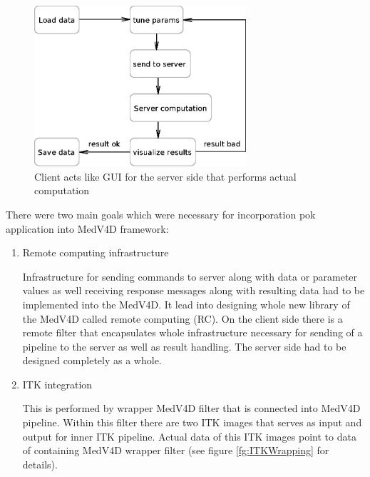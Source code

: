 \begin{figure}
    \centering
    \includegraphics[width=0.7\textwidth]{data/computationProcess}
    \caption[LevelSetClient application computation process]{Client acts like GUI for the server side that performs actual computation}
    \label{fg:computationProcess}
\end{figure}

\par
There were two main goals which were necessary for incorporation pok application into MedV4D framework:
\begin{enumerate}

  \item{Remote computing infrastructure}
  \par
  Infrastructure for sending commands to server along with data or parameter values as well receiving response messages along with resulting data had to be implemented into the MedV4D.
It lead into designing whole new library of the MedV4D called remote computing (RC).
On the client side there is a remote filter that encapsulates whole infrastructure necessary for sending of a pipeline to the server as well as result handling.
The server side had to be designed completely as a whole.

  \item{ITK integration}
  \par
  This is performed by wrapper MedV4D filter that is connected into MedV4D pipeline.
Within this filter there are two ITK images that serves as input and output for inner ITK pipeline.
Actual data of this ITK images point to data of containing MedV4D wrapper filter (see figure \ref{fg:ITKWrapping} for details).

\end{enumerate}

